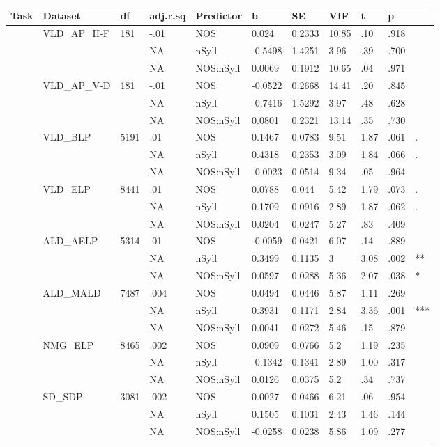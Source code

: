 \begin{table}[ht]
\centering
\begingroup\normalsize
\begin{tabular}{lllllllllll}
  \hline
Task & Dataset & df & adj.r.sq & Predictor & b & SE & VIF & t & p &  \\ 
  \hline
 & VLD\_AP\_H-F & 181 & -.01 & NOS & 0.024 & 0.2333 & 10.85 & .10 & .918 &   \\ 
   &  &  & NA & nSyll & -0.5498 & 1.4251 & 3.96 & .39 & .700 &   \\ 
   &  &  & NA & NOS:nSyll & 0.0069 & 0.1912 & 10.65 & .04 & .971 &   \\ 
   & VLD\_AP\_V-D & 181 & -.01 & NOS & -0.0522 & 0.2668 & 14.41 & .20 & .845 &   \\ 
   &  &  & NA & nSyll & -0.7416 & 1.5292 & 3.97 & .48 & .628 &   \\ 
   &  &  & NA & NOS:nSyll & 0.0801 & 0.2321 & 13.14 & .35 & .730 &   \\ 
   & VLD\_BLP & 5191 & .01 & NOS & 0.1467 & 0.0783 & 9.51 & 1.87 & .061 & . \\ 
   &  &  & NA & nSyll & 0.4318 & 0.2353 & 3.09 & 1.84 & .066 & . \\ 
   &  &  & NA & NOS:nSyll & -0.0023 & 0.0514 & 9.34 & .05 & .964 &   \\ 
   & VLD\_ELP & 8441 & .01 & NOS & 0.0788 & 0.044 & 5.42 & 1.79 & .073 & . \\ 
   &  &  & NA & nSyll & 0.1709 & 0.0916 & 2.89 & 1.87 & .062 & . \\ 
   &  &  & NA & NOS:nSyll & 0.0204 & 0.0247 & 5.27 & .83 & .409 &   \\ 
   & ALD\_AELP & 5314 & .01 & NOS & -0.0059 & 0.0421 & 6.07 & .14 & .889 &   \\ 
   &  &  & NA & nSyll & 0.3499 & 0.1135 & 3 & 3.08 & .002 & ** \\ 
   &  &  & NA & NOS:nSyll & 0.0597 & 0.0288 & 5.36 & 2.07 & .038 & * \\ 
   & ALD\_MALD & 7487 & .004 & NOS & 0.0494 & 0.0446 & 5.87 & 1.11 & .269 &   \\ 
   &  &  & NA & nSyll & 0.3931 & 0.1171 & 2.84 & 3.36 & .001 & *** \\ 
   &  &  & NA & NOS:nSyll & 0.0041 & 0.0272 & 5.46 & .15 & .879 &   \\ 
   & NMG\_ELP & 8465 & .002 & NOS & 0.0909 & 0.0766 & 5.2 & 1.19 & .235 &   \\ 
   &  &  & NA & nSyll & -0.1342 & 0.1341 & 2.89 & 1.00 & .317 &   \\ 
   &  &  & NA & NOS:nSyll & 0.0126 & 0.0375 & 5.2 & .34 & .737 &   \\ 
   & SD\_SDP & 3081 & .002 & NOS & 0.0027 & 0.0466 & 6.21 & .06 & .954 &   \\ 
   &  &  & NA & nSyll & 0.1505 & 0.1031 & 2.43 & 1.46 & .144 &   \\ 
   &  &  & NA & NOS:nSyll & -0.0258 & 0.0238 & 5.86 & 1.09 & .277 &   \\ 
   \hline
\end{tabular}
\endgroup
\end{table}
